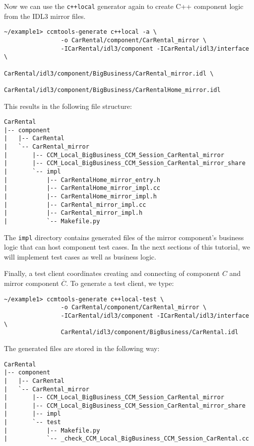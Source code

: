 Now we can use the {\tt c++local} generator again to create C++ component logic 
from the IDL3 mirror files.
\begin{small}
\begin{verbatim}
~/example1> ccmtools-generate c++local -a \
                -o CarRental/component/CarRental_mirror \
                -ICarRental/idl3/component -ICarRental/idl3/interface \
                CarRental/idl3/component/BigBusiness/CarRental_mirror.idl \
                CarRental/idl3/component/BigBusiness/CarRentalHome_mirror.idl
\end{verbatim}
\end{small}
This results in the following file structure:
\begin{small}
\begin{verbatim}
CarRental 
|-- component
|   |-- CarRental
|   `-- CarRental_mirror
|       |-- CCM_Local_BigBusiness_CCM_Session_CarRental_mirror
|       |-- CCM_Local_BigBusiness_CCM_Session_CarRental_mirror_share
|       `-- impl
|           |-- CarRentalHome_mirror_entry.h
|           |-- CarRentalHome_mirror_impl.cc
|           |-- CarRentalHome_mirror_impl.h
|           |-- CarRental_mirror_impl.cc
|           |-- CarRental_mirror_impl.h
|           `-- Makefile.py
\end{verbatim}
\end{small}

The {\tt impl} directory contains generated files of the mirror
component's business logic that can host component test cases.
In the next sections of this tutorial, we will implement test cases as well
as business logic. 

\newpage
Finally, a test client coordinates creating and connecting of component $C$ and 
mirror component $\overline{C}$.
To generate a test client, we type:
\begin{small}
\begin{verbatim}
~/example1> ccmtools-generate c++local-test \
                -o CarRental/component/CarRental_mirror \
                -ICarRental/idl3/component -ICarRental/idl3/interface \
                CarRental/idl3/component/BigBusiness/CarRental.idl
\end{verbatim}
\end{small}

The generated files are stored in the following way:
\begin{small}
\begin{verbatim}
CarRental
|-- component
|   |-- CarRental
|   `-- CarRental_mirror
|       |-- CCM_Local_BigBusiness_CCM_Session_CarRental_mirror
|       |-- CCM_Local_BigBusiness_CCM_Session_CarRental_mirror_share
|       |-- impl
|       `-- test
|           |-- Makefile.py
|           `-- _check_CCM_Local_BigBusiness_CCM_Session_CarRental.cc
\end{verbatim}
\end{small}

